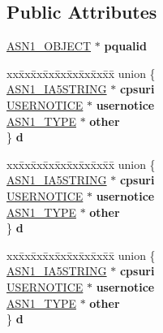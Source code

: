 \subsection*{Public Attributes}
\begin{DoxyCompactItemize}
\item 
\mbox{\label{structPOLICYQUALINFO__st_a743670de568313cec3599f52af0bea9e}} 
\hyperlink{structasn1__object__st}{A\+S\+N1\+\_\+\+O\+B\+J\+E\+CT} $\ast$ {\bfseries pqualid}
\item 
\mbox{\label{structPOLICYQUALINFO__st_a66870ddbb99e3b528016a8b1755f65bb}} 
\begin{tabbing}
xx\=xx\=xx\=xx\=xx\=xx\=xx\=xx\=xx\=\kill
union \{\\
\>\hyperlink{structasn1__string__st}{ASN1\_IA5STRING} $\ast$ {\bfseries cpsuri}\\
\>\hyperlink{structUSERNOTICE__st}{USERNOTICE} $\ast$ {\bfseries usernotice}\\
\>\hyperlink{structasn1__type__st}{ASN1\_TYPE} $\ast$ {\bfseries other}\\
\} {\bfseries d}\\

\end{tabbing}\item 
\mbox{\label{structPOLICYQUALINFO__st_a0468669e98842d13cfc73926ca1db802}} 
\begin{tabbing}
xx\=xx\=xx\=xx\=xx\=xx\=xx\=xx\=xx\=\kill
union \{\\
\>\hyperlink{structasn1__string__st}{ASN1\_IA5STRING} $\ast$ {\bfseries cpsuri}\\
\>\hyperlink{structUSERNOTICE__st}{USERNOTICE} $\ast$ {\bfseries usernotice}\\
\>\hyperlink{structasn1__type__st}{ASN1\_TYPE} $\ast$ {\bfseries other}\\
\} {\bfseries d}\\

\end{tabbing}\item 
\mbox{\label{structPOLICYQUALINFO__st_a02bd7829d610706c8f30e13950e7f5e8}} 
\begin{tabbing}
xx\=xx\=xx\=xx\=xx\=xx\=xx\=xx\=xx\=\kill
union \{\\
\>\hyperlink{structasn1__string__st}{ASN1\_IA5STRING} $\ast$ {\bfseries cpsuri}\\
\>\hyperlink{structUSERNOTICE__st}{USERNOTICE} $\ast$ {\bfseries usernotice}\\
\>\hyperlink{structasn1__type__st}{ASN1\_TYPE} $\ast$ {\bfseries other}\\
\} {\bfseries d}\\


\end{tabbing}
\end{DoxyCompactItemize}
